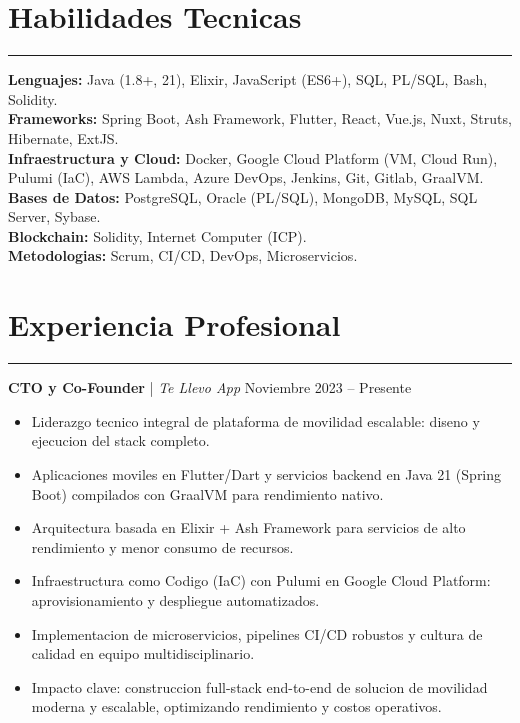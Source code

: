 \documentclass[11pt,a4paper]{article}
\begin{document}
\section*{Habilidades Tecnicas}
\hrule
\vspace{5pt}
\textbf{Lenguajes:} Java (1.8+, 21), Elixir, JavaScript (ES6+), SQL, PL/SQL, Bash, Solidity. \\
\textbf{Frameworks:} Spring Boot, Ash Framework, Flutter, React, Vue.js, Nuxt, Struts, Hibernate, ExtJS. \\
\textbf{Infraestructura y Cloud:} Docker, Google Cloud Platform (VM, Cloud Run), Pulumi (IaC), AWS Lambda, Azure DevOps, Jenkins, Git, Gitlab, GraalVM. \\
\textbf{Bases de Datos:} PostgreSQL, Oracle (PL/SQL), MongoDB, MySQL, SQL Server, Sybase. \\
\textbf{Blockchain:} Solidity, Internet Computer (ICP). \\
\textbf{Metodologias:} Scrum, CI/CD, DevOps, Microservicios.

\section*{Experiencia Profesional}
\hrule
\vspace{5pt}

\textbf{CTO y Co-Founder} | \textit{Te Llevo App} \hfill Noviembre 2023 -- Presente \\
\begin{itemize}[noitemsep, topsep=0pt]
    \item Liderazgo tecnico integral de plataforma de movilidad escalable: diseno y ejecucion del stack completo.
    \item Aplicaciones moviles en Flutter/Dart y servicios backend en Java 21 (Spring Boot) compilados con GraalVM para rendimiento nativo.
    \item Arquitectura basada en Elixir + Ash Framework para servicios de alto rendimiento y menor consumo de recursos.
    \item Infraestructura como Codigo (IaC) con Pulumi en Google Cloud Platform: aprovisionamiento y despliegue automatizados.
    \item Implementacion de microservicios, pipelines CI/CD robustos y cultura de calidad en equipo multidisciplinario.
    \item Impacto clave: construccion full-stack end-to-end de solucion de movilidad moderna y escalable, optimizando rendimiento y costos operativos.
\end{itemize}
\end{document}
